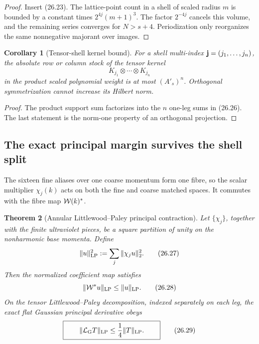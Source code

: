 \documentclass[11pt,oneside]{book}
\newtheorem{theorem}{Theorem}[chapter]
\newtheorem{corollary}[theorem]{Corollary}
\theoremstyle{definition}
\theoremstyle{remark}
\begin{document}
\begin{proof}
Insert (26.23).  The lattice-point count in a shell of scaled radius
\(m\) is bounded by a constant times \(2^{4j}(m+1)^3\).  The factor
\(2^{-4j}\) cancels this volume, and the remaining series converges
for \(N>s+4\).  Periodization only reorganizes the same nonnegative
majorant over images.
\end{proof}

\begin{corollary}[Tensor-shell kernel bound]
\label{cor:e8v26-tensor-shell}
For a shell multi-index
\({\bf j}=(j_1,\ldots,j_n)\), the absolute row or column stock of the
tensor kernel
\[
                  K_{j_1}\otimes\cdots\otimes K_{j_n}
\]
in the product scaled polynomial weight is at most
\((A'_s)^n\).  Orthogonal symmetrization cannot increase its Hilbert
norm.
\end{corollary}

\begin{proof}
The product support sum factorizes into the \(n\) one-leg sums in
(26.26).  The last statement is the norm-one property of an
orthogonal projection.
\end{proof}

\subsection{The exact principal margin survives the shell split}

The sixteen fine aliases over one coarse momentum form one fibre, so
the scalar multiplier \(\chi_j(k)\) acts on both the fine and coarse
matched spaces.  It commutes with the fibre map \({\cal W}(k)^*\).

\begin{theorem}[Annular Littlewood--Paley principal contraction]
\label{thm:e8v26-LP-contraction}
Let \(\{\chi_j\}\), together with the finite ultraviolet pieces, be a
square partition of unity on the nonharmonic base momenta.  Define
\[
 \|u\|_{\rm LP}^2:=\sum_j\|\chi_ju\|_2^2.                         \tag{26.27}
\]
Then the normalized coefficient map satisfies
\[
                         \|{\cal W}^*u\|_{\rm LP}
                         \leq\|u\|_{\rm LP}.                       \tag{26.28}
\]
On the tensor Littlewood--Paley decomposition, indexed separately on
each leg, the exact flat Gaussian principal derivative obeys
\[
\boxed{\qquad
                  \|\mathcal L_{\rm G}T\|_{\rm LP}
                  \leq\frac14\|T\|_{\rm LP}.
\qquad}                                                           \tag{26.29}
\]
\end{theorem}
\end{document}
